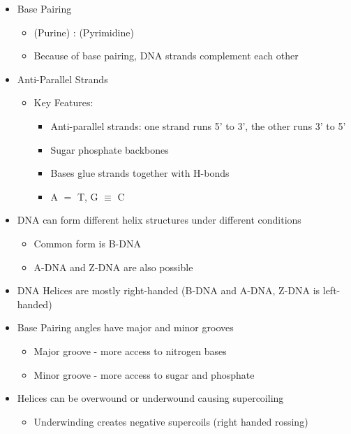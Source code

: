 \documentclass[12pt]{article}
\begin{document}
\begin{itemize}
\begin{itemize}
        \end{itemize}
        \item Base Pairing
        \begin{itemize}
            \item (Purine) : (Pyrimidine)
            \item Because of base pairing, DNA strands complement each other
        \end{itemize}
        \item Anti-Parallel Strands
        \begin{itemize}
            \item Key Features:
            \begin{itemize}
                \item Anti-parallel strands: one strand runs 5' to 3', the other runs 3' to 5'
                \item Sugar phosphate backbones
                \item Bases glue strands together with H-bonds
                \item A $=$ T, G $\equiv$ C
            \end{itemize}
        \end{itemize}
        \item DNA can form different helix structures under different conditions
        \begin{itemize}
            \item Common form is B-DNA
            \item A-DNA and Z-DNA are also possible
        \end{itemize}
        \item DNA Helices are mostly right-handed (B-DNA and A-DNA, Z-DNA is left-handed)
        \item Base Pairing angles have major and minor grooves
        \begin{itemize}
            \item Major groove - more access to nitrogen bases
            \item Minor groove - more access to sugar and phosphate
        \end{itemize}
        \item Helices can be overwound or underwound causing supercoiling
        \begin{itemize}
            \item Underwinding creates negative supercoils (right handed rossing) \\

\end{itemize}
\end{itemize}
\end{document}
